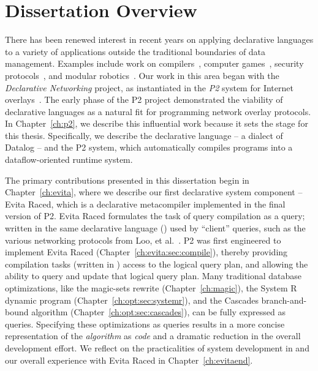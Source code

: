 \chapter[Dissertation Overview]{Dissertation Overview}
\label{ch:overview}

There has been renewed interest in recent years on applying declarative
languages to a variety of applications outside the traditional boundaries of
data management.  Examples include work on compilers~\cite{lam05context},
computer games~\cite{white-sigmod07}, security protocols~\cite{li-padl03}, and
modular robotics~\cite{ashley-iros07}.  Our work in this area began with the
{\em Declarative Networking} project, as instantiated in the {\em P2} system
for Internet overlays~\cite{p2:sosp, loo-sigmod06}.  The early phase of the P2
project demonstrated the viability of declarative languages as a natural fit
for programming network overlay protocols.  In Chapter~\ref{ch:p2}, we describe
this influential work because it sets the stage for this thesis.  Specifically,
we describe the declarative language \OVERLOG -- a dialect of Datalog -- and
the P2 system, which automatically compiles \OVERLOG programs into a
dataflow-oriented runtime system.

The primary contributions presented in this dissertation begin in
Chapter~\ref{ch:evita}, where we describe our first declarative system
component -- Evita Raced, which is a declarative metacompiler implemented in
the final version of P2.  Evita Raced formulates the task of query compilation
as a query; written in the same declarative language (\OVERLOG) used by
``client'' queries, such as the various networking protocols from Loo, et
al.~\cite{loo-sigmod06, p2:sosp}.  P2 was first engineered to implement Evita
Raced (Chapter~\ref{ch:evita:sec:compile}), thereby providing compilation tasks
(written in \OVERLOG) access to the logical query plan, and allowing the
ability to query and update that logical query plan.  Many traditional database
optimizations, like the magic-sets rewrite (Chapter~\ref{ch:magic}), the System
R dynamic program (Chapter~\ref{ch:opt:sec:systemr}), and the Cascades
branch-and-bound algorithm (Chapter~\ref{ch:opt:sec:cascades}), can be fully
expressed as \OVERLOG queries.  Specifying these optimizations as \OVERLOG
queries results in a more concise representation of the {\em algorithm} as {\em
code} and a dramatic reduction in the overall development effort.  We reflect
on the practicalities of system development in \OVERLOG and our overall
experience with Evita Raced in Chapter~\ref{ch:evitaend}.
 
